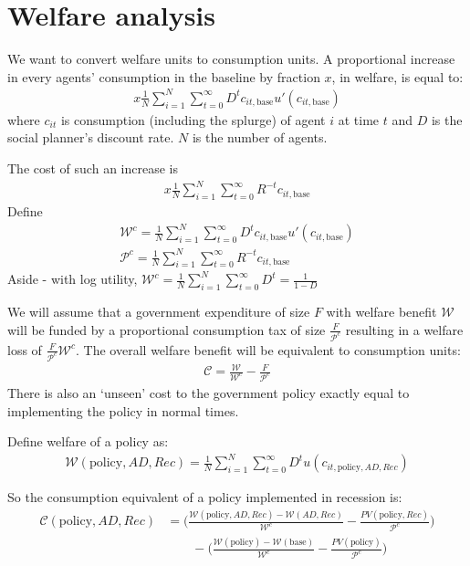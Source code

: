 \documentclass[../HAFiscal]{subfiles}
\begin{document}
\section{Welfare analysis}

We want to convert welfare units to consumption units. A proportional increase in every agents' consumption in the baseline by fraction $x$, in welfare, is equal to:
\begin{align}
x\frac{1}{N}\sum_{i=1}^{N} \sum_{t=0}^{\infty} D^t c_{it,\text{base}} u'(c_{it,\text{base}})
\end{align}
where $c_{it}$ is consumption (including the splurge) of agent $i$ at time $t$ and $D$ is the social planner's discount rate. $N$ is the number of agents.


The cost of such an increase is
\begin{align}
x\frac{1}{N}\sum_{i=1}^{N} \sum_{t=0}^{\infty} R^{-t} c_{it,\text{base}}
\end{align}
Define
\begin{align}
\mathcal{W}^c =\frac{1}{N}\sum_{i=1}^{N} \sum_{t=0}^{\infty} D^t c_{it,\text{base}} u'(c_{it,\text{base}}) \\
\mathcal{P}^c = \frac{1}{N}\sum_{i=1}^{N} \sum_{t=0}^{\infty} R^{-t} c_{it,\text{base}}
\end{align}
Aside - with log utility, $\mathcal{W}^c =\frac{1}{N}\sum_{i=1}^{N} \sum_{t=0}^{\infty} D^t = \frac{1}{1-D}$

We will assume that a government expenditure of size $F$ with welfare benefit $\mathcal{W}$ will be funded by a proportional consumption tax of size $\frac{F}{\mathcal{P}^c}$ resulting in a welfare loss of $\frac{F}{\mathcal{P}^c}\mathcal{W}^c$. The overall welfare benefit will be equivalent to consumption units:
\begin{align}
\mathcal{C} = \frac{\mathcal{W}}{\mathcal{W}^c} - \frac{F}{\mathcal{P}^c}
\end{align}
There is also an `unseen' cost to the government policy exactly equal to implementing the policy in normal times.

Define welfare of a policy as:
\begin{align}
\mathcal{W}(\text{policy},AD,Rec) = \frac{1}{N}\sum_{i=1}^{N} \sum_{t=0}^{\infty} D^t u(c_{it,\text{policy},AD,Rec})
\end{align}

So the consumption equivalent of a policy implemented in recession is:
\begin{align}
\mathcal{C}(\text{policy},AD,Rec) &= \bigg(\frac{\mathcal{W}(\text{policy},AD,Rec)-\mathcal{W}(AD,Rec)}{\mathcal{W}^c} - \frac{PV(\text{policy},Rec)}{\mathcal{P}^c} \bigg)\\ \nonumber
& \qquad -
\bigg(\frac{\mathcal{W}(\text{policy}) - \mathcal{W}(\text{base})}{\mathcal{W}^c} - \frac{PV(\text{policy})}{\mathcal{P}^c} \bigg)
\end{align}
\end{document}
